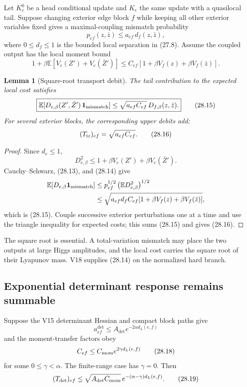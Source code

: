 \documentclass[11pt]{article}
\newtheorem{lemma}[theorem]{Lemma}
\theoremstyle{remark}
\begin{document}
Let \(K_e^0\) be a head conditional update and \(K_e\) the same
update with a quasilocal tail.  Suppose changing exterior edge block
\(f\) while keeping all other exterior variables fixed gives a
maximal-coupling mismatch probability
\[
 p_{ef}(z,\bar z)
 \le a_{ef}\,d_f(z,\bar z),                                \tag{28.13}
\]
where \(0\le d_f\le1\) is the bounded local separation in (27.8).
Assume the coupled output has the local moment bound
\[
 1+\beta\mathbb E[
 V_e(Z')+V_e(\bar Z')]
 \le
 C_{ef}
 [1+\beta V_f(z)+\beta V_f(\bar z)].                       \tag{28.14}
\]

\begin{lemma}[Square-root transport debit]
\label{lem:v15v28-square-root}
The tail contribution to the expected local cost satisfies
\[
 \boxed{
 \mathbb E[
 D_{e,\beta}(Z',\bar Z')\,{\bf 1}_{\rm mismatch}]
 \le
 \sqrt{a_{ef}C_{ef}}\,
 D_{f,\beta}(z,\bar z).}                                   \tag{28.15}
\]
For several exterior blocks, the corresponding upper debits add:
\[
 (T_{\rm tr})_{ef}
 =
 \sqrt{a_{ef}C_{ef}}.                                      \tag{28.16}
\]
\end{lemma}

\begin{proof}
Since \(d_e\le1\),
\[
 D_{e,\beta}^2
 \le1+\beta V_e(Z')+\beta V_e(\bar Z').
\]
Cauchy--Schwarz, (28.13), and (28.14) give
\[
\begin{aligned}
 \mathbb E[D_{e,\beta}{\bf 1}_{\rm mismatch}]
 &\le
 p_{ef}^{1/2}
 \left(\mathbb ED_{e,\beta}^2\right)^{1/2}\\
 &\le
 \sqrt{a_{ef}d_fC_{ef}
 [1+\beta V_f(z)+\beta V_f(\bar z)]},
\end{aligned}
\]
which is (28.15).  Couple successive exterior perturbations one at
a time and use the triangle inequality for expected costs; this
sums (28.15) and gives (28.16).
\end{proof}

The square root is essential.  A total-variation mismatch may place
the two outputs at large Higgs amplitudes, and the local cost carries
the square root of their Lyapunov mass.  V18 supplies (28.14) on the
normalized hard branch.

\subsection{Exponential determinant response remains summable}

Suppose the V15 determinant Hessian and compact block paths give
\[
 a_{ef}^{\det}
 \le A_{\det}e^{-2\alpha d_L(e,f)}                          \tag{28.17}
\]
and the moment-transfer factors obey
\[
 C_{ef}\le C_{\rm mom}e^{2\gamma d_L(e,f)}                 \tag{28.18}
\]
for some \(0\le\gamma<\alpha\).  The finite-range case has
\(\gamma=0\).  Then
\[
 (T_{\det})_{ef}
 \le
 \sqrt{A_{\det}C_{\rm mom}}\,
 e^{-(\alpha-\gamma)d_L(e,f)}.                             \tag{28.19}
\]
\end{document}
